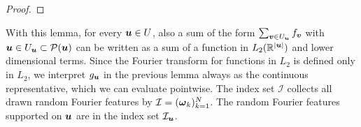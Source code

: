 \documentclass{article}
\renewcommand{\vec}[1]{\ensuremath \mathbf{\boldsymbol{#1}}}
\newcommand{\w}{\ensuremath{\vec \omega}}
\newcommand{\x}{\ensuremath{\vec x}}
\newcommand{\I}{\ensuremath{\mathcal{I}}}
\newcommand{\R}{\ensuremath{\mathbb{R}}}
\newcommand{\dx}{\mathrm{d}}
\renewcommand{\d}{\, \mathrm{d}}
\newcommand{\norm}[1]{\left\lVert {#1} \right\rVert}    %
\theoremstyle{definition}
\numberwithin{equation}{section}
\begin{document}
\begin{proof}
\end{proof}
With this lemma, for every $\vec u\in U$, also a sum of the form $\sum_{\vec v\in U_{\vec u}} f_{\vec v}$ with $\vec u\in U_{\vec u} \subset \mathcal P(\vec u) $ can be written as a sum of a function in $L_2(\R^{|\vec u|})$ and lower dimensional terms. Since the Fourier transform for functions in $L_2$ is defined only in $L_2$, we interpret ${g_{\vec u}}$ in the previous lemma always as the continuous representative, which we can evaluate pointwise.
The index set $\I$ collects all drawn random Fourier features by $\I = (\w_{k})_{k=1}^N$. The random Fourier features  supported on $\vec u$ are in the index set $\I_{\vec u}$. 
\end{document}
